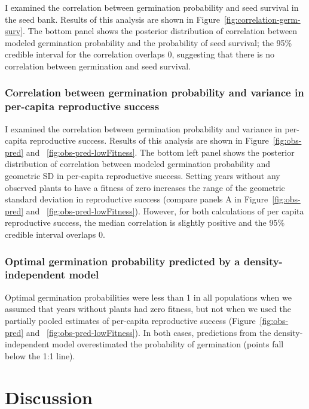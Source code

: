 \documentclass[12pt, oneside, titlepage]{article}   	%
\begin{document}
{I examined the correlation between germination probability and seed survival in the seed bank. Results of this analysis are shown in Figure~\ref{fig:correlation-germ-surv}. The bottom panel shows the posterior distribution of correlation between modeled germination probability and the probability of seed survival; the 95\% credible interval for the correlation overlaps 0, suggesting that there is no correlation between germination and seed survival. 

\subsubsection*{Correlation between germination probability and variance in per-capita reproductive success}

I examined the correlation between germination probability and variance in per-capita reproductive success. Results of this analysis are shown in Figure~\ref{fig:obs-pred} and ~\ref{fig:obs-pred-lowFitness}. The bottom left panel shows the posterior distribution of correlation between modeled germination probability and geometric SD in per-capita reproductive success. Setting years without any observed plants to have a fitness of zero increases the range of the geometric standard deviation in reproductive success (compare panels A in Figure~\ref{fig:obs-pred} and ~\ref{fig:obs-pred-lowFitness}). However, for both calculations of per capita reproductive success, the median correlation is slightly positive and the 95\% credible interval overlaps 0.

\subsubsection*{Optimal germination probability predicted by a density-independent model}

Optimal germination probabilities were less than 1 in all populations when we assumed that years without plants had zero fitness, but not when we used the partially pooled estimates of per-capita reproductive success (Figure~\ref{fig:obs-pred} and ~\ref{fig:obs-pred-lowFitness}). In both cases, predictions from the density-independent model overestimated the probability of germination (points fall below the 1:1 line).

\section*{Discussion}

}
\end{document}
